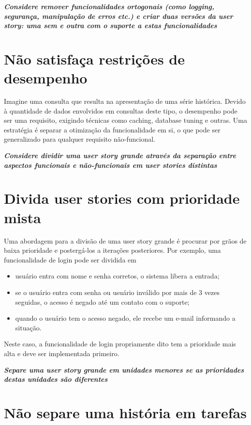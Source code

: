 \documentclass[a4paper,abntfigtabnum,noindentfirst]{abnt}
\begin{document}
\textit{\textbf{Considere remover funcionalidades ortogonais (como logging, segurança, manipulação de erros etc.) e criar duas versões da user story: uma sem e outra com o suporte a estas funcionalidades}}


\section{Não satisfaça restrições de desempenho}

Imagine uma consulta que resulta na apresentação de uma série histórica. Devido à quantidade de dados envolvidos em consultas deste tipo, o desempenho pode ser uma requisito, exigindo técnicas como caching, database tuning e outras. Uma estratégia é separar a otimização da funcionalidade em si, o que pode ser generalizado para qualquer requisito não-funcional.

\textit{\textbf{Considere dividir uma user story grande através da separação entre aspectos funcionais e não-funcionais em user stories distintas}}


\section{Divida user stories com prioridade mista}

Uma abordagem para a divisão de uma user story grande é procurar por grãos de baixa prioridade e postergá-los a iterações posteriores. Por exemplo, uma funcionalidade de login pode ser dividida em
\begin{itemize}
\item usuário entra com nome e senha corretos, o sistema libera a entrada;
\item se o usuário entra com senha ou usuário inválido por mais de 3 vezes seguidas, o acesso é negado até um contato com o suporte;
\item quando o usuário tem o acesso negado, ele recebe um e-mail informando a situação.
\end{itemize}
Neste caso, a funcionalidade de login propriamente dito tem a prioridade mais alta e deve ser implementada primeiro.

\textit{\textbf{Separe uma user story grande em unidades menores se as prioridades destas unidades são diferentes}}



\section{Não separe uma história em tarefas}
\end{document}
